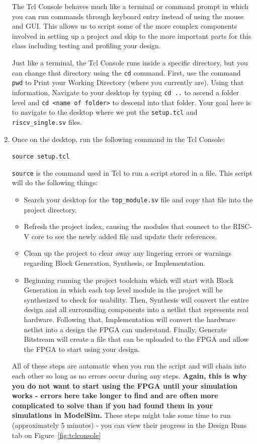 \documentclass{article}
\begin{document}
\begin{enumerate}
The Tcl Console behaves much like a terminal or command prompt in which you can
run commands through keyboard entry instead of using the mouse and GUI.  This
allows us to script some of the more complex components involved in setting up
a project and skip to the more important parts for this class including testing
and profiling your design.

Just like a terminal, the Tcl Console runs inside a specific directory, but you
can change that directory using the \verb|cd| command.  First, use the command
\verb|pwd| to Print your Working Directory (where you currently are).  Using
that information, Navigate to your desktop by typing \verb|cd ..| to
ascend a folder level and \verb|cd <name of folder>| to descend into that
folder.  Your goal here is to navigate to the desktop where we put the
\verb|setup.tcl| and \verb|riscv_single.sv| files.

\item Once on the desktop, run the following command in the Tcl Console:

\verb|source setup.tcl|

\verb|source| is the command used in Tcl to run a script stored in a file. This
script will do the following things:
\begin{itemize}
\item Search your desktop for the \verb|top_module.sv| file and copy that
  file into the project directory.
	
\item Refresh the project index, causing the modules that connect to the
  RISC-V core to see the newly added file and update their references.
	
\item Clean up the project to clear away any lingering errors or warnings
  regarding Block Generation, Synthesis, or Implementation.
	
\item Beginning running the project toolchain which will start with Block
  Generation in which each top level module in the project will be
  synthesized to check for usability.  Then, Synthesis will convert the entire
  design and all surrounding components into a netlist
  that represents real hardware.  Following that, Implementation will convert
  the hardware netlist into a design the FPGA can understand.  Finally,
  Generate Bitstream will create a file that can be uploaded to the FPGA and
  allow the FPGA to start using your design.
\end{itemize}
All of these steps are automatic when you run the script and will chain into
each other so long as no errors occur during any steps.  \textbf{Again, this is
why you do not want to start using the FPGA until your simulation works - errors
here take longer to find and are often more complicated to solve than if you had
found them in your simulations in ModelSim.}  These steps might take some time to
run (approximately 5 minutes) - you can view their progress in the Design Runs
tab on Figure~\ref{fig:tclconsole}


\end{enumerate}
\end{document}
